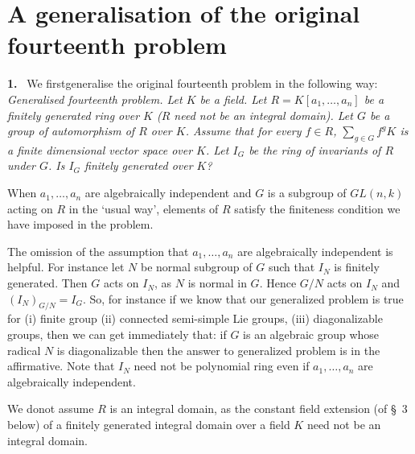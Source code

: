 \chapter{A generalisation of the original fourteenth problem} %


{\bf 1.}~ We first\pageoriginale generalise the original fourteenth problem
in  the following  way: \textit{Generalised fourteenth  problem. Let  $K$ be
a field. Let $R=K[a_1, \ldots , a_n]$ be a finitely generated
  ring over $K$ ($R$ need  not be an integral domain). 
Let  $G$ be a group  of automorphism of $R$ over
$K$. Assume that  for every $f \in R$, $\sum\limits_{g \in G}
f^gK$ is a finite  dimensional vector  space  over
$K$. Let  $I_G$ be the  ring  of invariants of $R$
under $G$. Is  $I_G$ finitely  generated
  over $K$?} 

\begin{rem}%
 When $a_1, \ldots , a_n$ are  algebraically independent  and $G$  is
 a subgroup of $GL(n,k)$ acting  on $R$  in the `usual way',
 elements  of $R$ satisfy the  finiteness condition  we have  imposed
 in the  problem. 
\end{rem}

\begin{rem}%
 The omission of the  assumption that $a_1, \ldots , a_n$ are
 algebraically independent  is helpful. For  instance  let $N$ be
 normal  subgroup  of $G$  such that $I_N$  is finitely
 generated. Then  $G$ acts  on $I_N$, as  $N$ is  normal  in
 $G$. Hence  $G/N$ acts on $I_N$ and $(I_N)_{G/N}=I_G$. So, for
 instance if we know that our generalized problem is true  for (i)
 finite group (ii) connected semi-simple Lie groups, (iii)
 diagonalizable  groups, then  we can  get  immediately  that: if $G$
 is an  algebraic  group  whose radical $N$ is  diagonalizable then
 the answer to generalized problem  is in the affirmative. Note  that
 $I_N$ need not be polynomial ring  even if $a_1, \ldots , a_n$ are
 algebraically independent.   
\end{rem}

\begin{rem}%
We do\pageoriginale not assume  $R$ is  an integral domain, as  the
constant  field 
extension (of \S\ 3 below) of a finitely generated integral domain
over a field  $K$ need  not be  an integral  domain. 
\end{rem}

